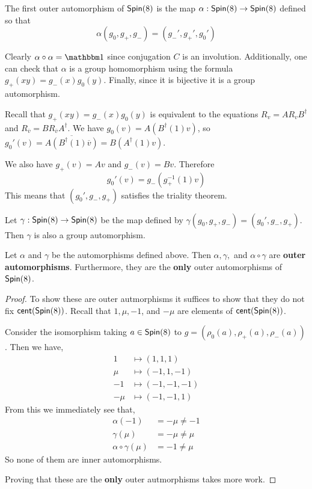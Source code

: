 \begin{defn}
The first outer automorphism of $\operatorname{\textsf{Spin}}(8)$ is the map $\alpha : \operatorname{\textsf{Spin}}(8)\to \operatorname{\textsf{Spin}}(8)$ defined so that
\[\alpha(g_0,g_+,g_-)=(g_-',g_+',g_0')\]
\end{defn}
\begin{remark*}
    Clearly $\alpha\circ\alpha = \One$ since conjugation $C$ is an involution. Additionally, one can check that $\alpha$ is a group homomorphism using the formula $g_+(xy)=g_-(x)g_0(y)$. Finally, since it is bijective it is a group automorphism.
\end{remark*}
\begin{remark*}
    Recall that $g_+(xy)=g_-(x)g_0(y)$ is equivalent to the equations $R_v = A R_v B^\dagger$ and $R_{\overline{v}} = BR_{\overline{v}}A^\dagger$. We have $g_0(v) = A(B^\dagger(1)v)$, so $g_0'(v) = \overline{A(B^\dagger(1)\overline{v})} = B(A^\dagger(1)v)$. 

    We also have $g_+(v) = Av$ and $g_-(v) = Bv$. Therefore
    \[g_0'(v) = g_-(g_+^{-1}(1)v)\]
    This means that $(g_0', g_-,g_+)$ satisfies the triality theorem.
\end{remark*}
\begin{defn}
Let $\gamma : \operatorname{\textsf{Spin}}(8)\to \operatorname{\textsf{Spin}}(8)$ be the map defined by $\gamma(g_0,g_+,g_-) = (g_0',g_-,g_+)$. Then $\gamma$ is also a group automorphism.
\end{defn}
\begin{thm}
Let $\alpha$ and $\gamma$ be the automorphisms defined above. Then $\alpha, \gamma,$ and $\alpha\circ\gamma$ are \textbf{outer automorphisms}. Furthermore, they are the \textbf{only} outer automorphisms of $\operatorname{\textsf{Spin}}(8)$.
\end{thm}
\begin{proof}
To show these are outer autmorphisms it suffices to show that they do not fix $\operatorname{\textsf{cent}}(\operatorname{\textsf{Spin}}(8))$. Recall that $1,\mu,-1$, and $-\mu$ are elements of $\operatorname{\textsf{cent}}(\operatorname{\textsf{Spin}}(8))$.

Consider the isomorphism taking $a \in \operatorname{\textsf{Spin}}(8)$ to $g=(\rho_0(a),\rho_+(a),\rho_-(a))$. Then we have,
\begin{align*}
    1&\mapsto (1,1,1)\\
    \mu&\mapsto (-1,1,-1)\\
    -1&\mapsto (-1,-1,-1)\\
    -\mu&\mapsto (-1,-1,1)
\end{align*}
From this we immediately see that,
\begin{align*}
    \alpha(-1)&=-\mu \neq -1\\
    \gamma(\mu)&=-\mu \neq \mu\\
    \alpha\circ\gamma(\mu)&=-1\neq \mu
\end{align*}
So none of them are inner automorphisms.

Proving that these are the \textbf{only} outer autmorphisms takes more work.
\end{proof}